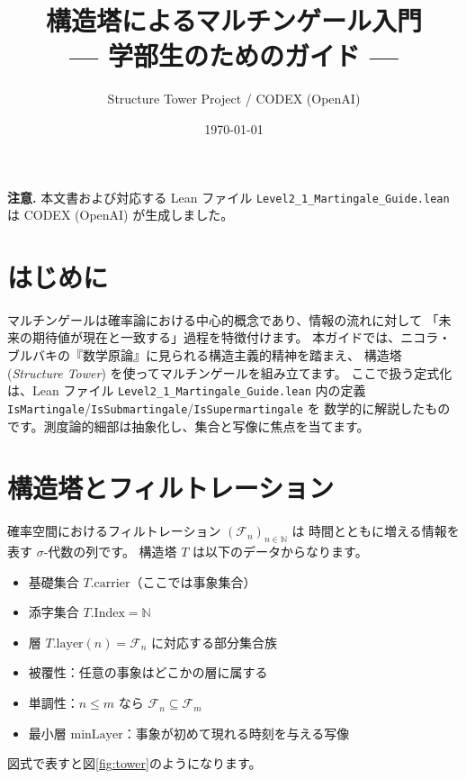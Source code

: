 \documentclass[12pt]{ltjsarticle}
\title{構造塔によるマルチンゲール入門\\{\large --- 学部生のためのガイド ---}}
\author{Structure Tower Project / CODEX (OpenAI)}
\date{\today}
\theoremstyle{definition}
\theoremstyle{plain}
\begin{document}
\maketitle
\tableofcontents

\bigskip

\begin{center}
  \textbf{注意.} 本文書および対応する Lean ファイル
  \texttt{Level2\_1\_Martingale\_Guide.lean} は CODEX (OpenAI) が生成しました。
\end{center}

\section{はじめに}

マルチンゲールは確率論における中心的概念であり、情報の流れに対して
「未来の期待値が現在と一致する」過程を特徴付けます。
本ガイドでは、ニコラ・ブルバキの『数学原論』に見られる構造主義的精神を踏まえ、
構造塔 (\emph{Structure Tower}) を使ってマルチンゲールを組み立てます。
ここで扱う定式化は、Lean ファイル
\texttt{Level2\_1\_Martingale\_Guide.lean} 内の定義
\texttt{IsMartingale}/\texttt{IsSubmartingale}/\texttt{IsSupermartingale} を
数学的に解説したものです。測度論的細部は抽象化し、集合と写像に焦点を当てます。

\section{構造塔とフィルトレーション}

確率空間におけるフィルトレーション $(\mathcal{F}_n)_{n\in\mathbb{N}}$ は
時間とともに増える情報を表す $\sigma$-代数の列です。
構造塔 $T$ は以下のデータからなります。
\begin{itemize}[leftmargin=1.5em]
  \item 基礎集合 $T.\mathrm{carrier}$（ここでは事象集合）
  \item 添字集合 $T.\mathrm{Index}=\mathbb{N}$
  \item 層 $T.\mathrm{layer}(n)=\mathcal{F}_n$ に対応する部分集合族
  \item 被覆性：任意の事象はどこかの層に属する
  \item 単調性：$n\le m$ なら $\mathcal{F}_n\subseteq \mathcal{F}_m$
  \item 最小層 $\mathrm{minLayer}$：事象が初めて現れる時刻を与える写像
\end{itemize}

図式で表すと図\ref{fig:tower}のようになります。
\end{document}

